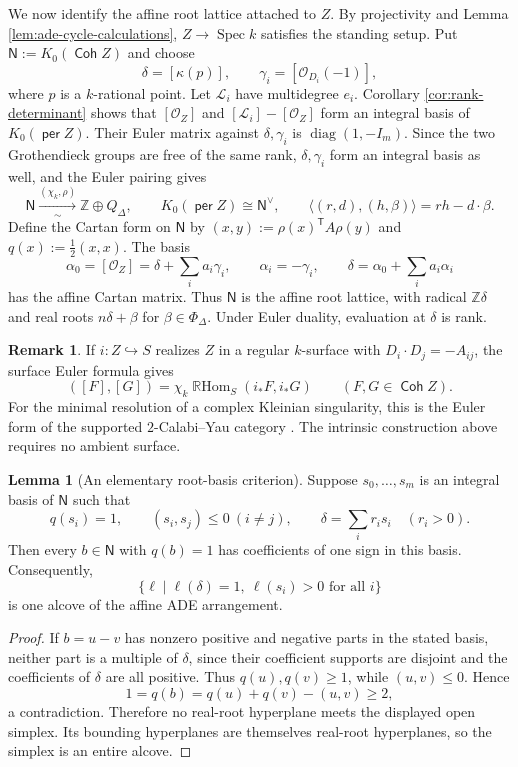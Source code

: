 \documentclass[a4paper,reqno]{amsart}
\def\L{\mathcal{L}}
\def\O{\mathcal{O}}
\DeclareMathOperator{\Coh}{\mathsf{Coh}}
\DeclareMathOperator{\per}{\mathsf{per}}
\DeclareMathOperator{\Spec}{Spec}
\DeclareMathOperator{\RHom}{\mathbb{R}Hom}
\theoremstyle{definition}
\newtheorem{Lem}[Thm]{Lemma}
\newtheorem{Rem}[Thm]{Remark}
\begin{document}
We now identify the affine root lattice attached to $Z$. By projectivity and Lemma \ref{lem:ade-cycle-calculations}, $Z\to\Spec k$ satisfies the standing setup. Put $\mathsf N:=K_0(\Coh Z)$ and choose
\[
\delta=[\kappa(p)],\qquad \gamma_i=[\O_{D_i}(-1)],
\]
where $p$ is a $k$-rational point. Let $\L_i$ have multidegree $e_i$. Corollary \ref{cor:rank-determinant} shows that $[\O_Z]$ and $[\L_i]-[\O_Z]$ form an integral basis of $K_0(\per Z)$. Their Euler matrix against $\delta,\gamma_i$ is $\operatorname{diag}(1,-I_m)$. Since the two Grothendieck groups are free of the same rank, $\delta,\gamma_i$ form an integral basis as well, and the Euler pairing gives
\[
\mathsf N\xrightarrow[\sim]{(\chi_k,\rho)}\mathbb Z\oplus Q_\Delta,
\qquad K_0(\per Z)\cong\mathsf N^\vee,
\qquad \langle(r,d),(h,\beta)\rangle=rh-d\cdot\beta.
\]
Define the Cartan form on $\mathsf N$ by $(x,y):=\rho(x)^{\mathsf T}A\rho(y)$ and $q(x):=\tfrac12(x,x)$. The basis
\[
\alpha_0=[\O_Z]=\delta+\sum_i a_i\gamma_i,\qquad
\alpha_i=-\gamma_i,\qquad
\delta=\alpha_0+\sum_i a_i\alpha_i
\]
has the affine Cartan matrix. Thus $\mathsf N$ is the affine root lattice, with radical $\mathbb Z\delta$ and real roots $n\delta+\beta$ for $\beta\in\Phi_\Delta$. Under Euler duality, evaluation at $\delta$ is rank.

\begin{Rem}
If $i\colon Z\hookrightarrow S$ realizes $Z$ in a regular $k$-surface with $D_i\cdot D_j=-A_{ij}$, the surface Euler formula gives
\[
([F],[G])=\chi_k\RHom_S(i_*F,i_*G)
\qquad(F,G\in\Coh Z).
\]
For the minimal resolution of a complex Kleinian singularity, this is the Euler form of the supported $2$-Calabi--Yau category \cite[Section 2.1]{Bri09}. The intrinsic construction above requires no ambient surface.
\end{Rem}

\begin{Lem}[An elementary root-basis criterion]\label{lem:ade-obtuse-basis}
Suppose $s_0,\ldots,s_m$ is an integral basis of $\mathsf N$ such that
\[
q(s_i)=1,\qquad (s_i,s_j)\le0\ (i\ne j),\qquad
\delta=\sum_i r_i s_i\quad(r_i>0).
\]
Then every $b\in\mathsf N$ with $q(b)=1$ has coefficients of one sign in this basis. Consequently,
\[
\{\ell\mid\ell(\delta)=1,\ \ell(s_i)>0\text{ for all }i\}
\]
is one alcove of the affine ADE arrangement.
\end{Lem}
\begin{proof}
If $b=u-v$ has nonzero positive and negative parts in the stated basis, neither part is a multiple of $\delta$, since their coefficient supports are disjoint and the coefficients of $\delta$ are all positive. Thus $q(u),q(v)\ge1$, while $(u,v)\le0$. Hence
\[
1=q(b)=q(u)+q(v)-(u,v)\ge2,
\]
a contradiction. Therefore no real-root hyperplane meets the displayed open simplex. Its bounding hyperplanes are themselves real-root hyperplanes, so the simplex is an entire alcove.
\end{proof}
\end{document}
